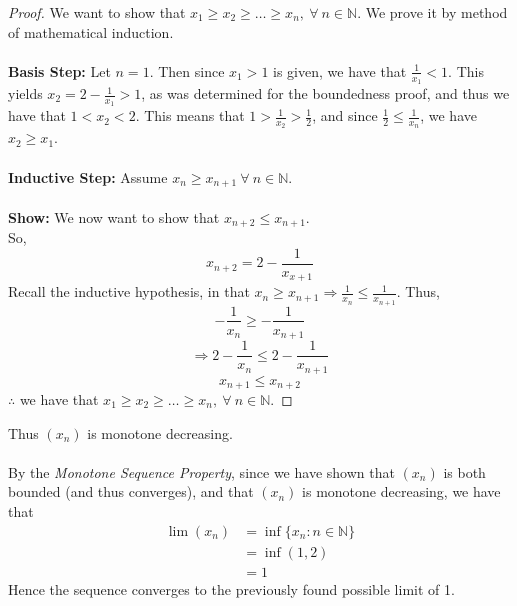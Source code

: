 \documentclass[12pt,letterpaper]{article}
\newcommand{\N}{\mathbb{N}}
\theoremstyle{case}
\theoremstyle{definition}
\begin{document}
\begin{enumerate}
\begin{enumerate}
\begin{enumerate}
			\begin{proof}
				We want to show that $x_1 \geq x_2 \geq \dots \geq x_n,\ \forall\ n \in \N$. We prove it by method of mathematical induction.
				\\\\\textbf{Basis Step:} Let $n=1$. Then since $x_1 >1$ is given, we have that $\frac{1}{x_1} < 1$. This yields $x_2=2-\frac{1}{x_1}>1$, as was determined for the boundedness proof, and thus we have that $1 < x_2 < 2$. This means that $1 > \frac{1}{x_2} > \frac{1}{2}$, and since $\frac{1}{2} \leq \frac{1}{x_n}$, we have $x_2 \geq x_1$.
				\\\\\textbf{Inductive Step:} Assume $x_n \geq x_{n+1}\ \forall\ n \in \N$.
				\\\\\textbf{Show:} We now want to show that $x_{n+2} \leq x_{n+1}$.
				\\So,
				\[x_{n+2}=2-\frac{1}{x_{x+1}}\]
				Recall the inductive hypothesis, in that $x_n \geq x_{n+1} \Rightarrow \frac{1}{x_n} \leq \frac{1}{x_{n+1}}$. Thus,
				\[-\frac{1}{x_n} \geq -\frac{1}{x_{n+1}}\]
				\[\Rightarrow 2-\frac{1}{x_n} \leq 2 -\frac{1}{x_{n+1}}\]
				\[x_{n+1} \leq x_{n+2}\]
				$\therefore$ we have that $x_1 \geq x_2 \geq \dots \geq x_n,\ \forall\ n \in \N$.
			\end{proof}
			Thus $(x_n)$ is monotone decreasing.
			\\\\By the \textit{Monotone Sequence Property}, since we have shown that $(x_n)$ is both bounded (and thus converges), and that $(x_n)$ is monotone decreasing, we have that
			\begin{align*}
				\lim (x_n) &= \inf \{x_n: n \in \N\} \\
				&=\inf (1,2) \\
				&= 1
			\end{align*}
			Hence the sequence converges to the previously found possible limit of 1. \\
			

\end{enumerate}
\end{enumerate}
\end{enumerate}
\end{document}

